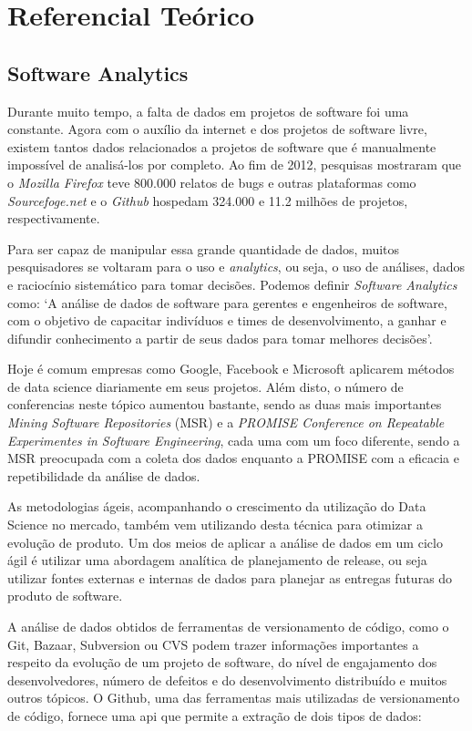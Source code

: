 \chapter{Referencial Teórico}
\label{ref}
\section{Software Analytics}
\label{ref:sof}
Durante muito tempo, a falta de dados em projetos de software foi uma constante.
Agora com o auxílio da internet e dos projetos de software livre, existem tantos
dados relacionados a projetos de software que é manualmente impossível de analisá-los
por completo\cite{artAndScience}. Ao fim de 2012, pesquisas mostraram que o \textit{Mozilla Firefox} 
teve 800.000 relatos de bugs e outras plataformas como \textit{Sourcefoge.net}
e o \textit{Github} hospedam 324.000 e 11.2 milhões de projetos, respectivamente\cite{informationNeeds}.

Para ser capaz de manipular essa grande quantidade de dados, muitos pesquisadores
se voltaram para o uso e \textit{analytics}, ou seja, o uso de análises, dados e
raciocínio sistemático para tomar decisões. Podemos definir \textit{Software Analytics}
como: `A análise de dados de software para gerentes e engenheiros de software, 
com o objetivo de capacitar indivíduos e times de desenvolvimento, a ganhar e difundir 
conhecimento a partir de seus dados para tomar melhores decisões'\cite{informationNeeds}.

Hoje é comum empresas como Google, Facebook e Microsoft aplicarem métodos de data
science diariamente em seus projetos. Além disto, o número de conferencias neste
tópico aumentou bastante, sendo as duas mais importantes \textit{Mining Software
Repositories} (MSR) e a \textit{PROMISE Conference on Repeatable Experimentes in Software
Engineering}, cada uma com um foco diferente, sendo a MSR preocupada com a coleta dos dados
enquanto a PROMISE com a eficacia e repetibilidade da análise de dados.

As metodologias ágeis, acompanhando o crescimento da utilização do Data Science no
mercado, também vem utilizando desta técnica para otimizar a evolução de produto. Um
dos meios de aplicar a análise de dados em um ciclo ágil é utilizar uma abordagem 
analítica de planejamento de release, ou seja utilizar fontes externas e internas
de dados para planejar as entregas futuras do produto de software. 

A análise de dados obtidos de ferramentas de versionamento de código, como o Git,
Bazaar, Subversion ou CVS podem trazer informações importantes a respeito da evolução
de um projeto de software, do nível de engajamento dos desenvolvedores, número de defeitos
e do desenvolvimento distribuído e muitos outros tópicos\cite{artAndScience}. O Github,
uma das ferramentas mais utilizadas de versionamento de código, fornece uma api que permite
a extração de dois tipos de dados:

